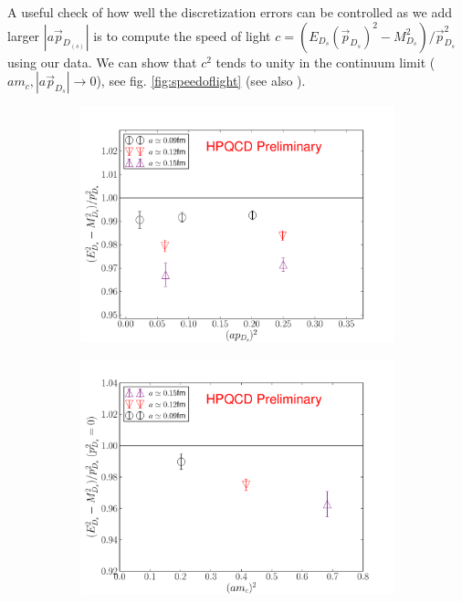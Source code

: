 \documentclass[a4paper,10pt]{article}
\numberwithin{equation}{section}
\begin{document}
A useful check of how well the discretization errors can be controlled as we add larger $|a\vec{p}_{D_{(s)}}|$ is to compute the speed of light $c = (E_{D_s}(\vec{p}_{D_s})^2 - M_{D_s}^2) / \vec{p}_{D_s}^2$ using our data. We can show that $c^2$ tends to unity in the continuum limit ($am_c,\left\vert a\vec{p}_{D_s} \right\vert\to 0$), see fig. \ref{fig:speedoflight} (see also \cite{Donald:2012ga}). 

\begin{figure}
\centering
\begin{subfigure}{.5\textwidth}
  \centering
  \includegraphics[width=1.0\linewidth]{niceplots/c2_proceedings17.pdf}
  \label{fig:sub1}
\end{subfigure}%
\begin{subfigure}{.5\textwidth}
  \centering
  \includegraphics[width=1.0\linewidth]{niceplots/c2p0_proceedings17.pdf}

\end{subfigure}
\end{figure}
\end{document}
